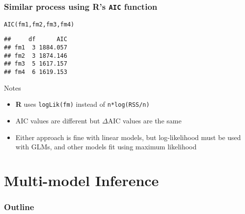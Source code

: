\documentclass[color=usenames,dvipsnames]{beamer}\usepackage[]{graphicx}\usepackage[]{color}
\makeatletter
\newcommand{\hlstd}[1]{\textcolor[rgb]{0,0,0}{#1}}%
\newcommand{\hlkwd}[1]{\textcolor[rgb]{0.004,0.004,0.506}{#1}}%
\newenvironment{kframe}{%
 \def\at@end@of@kframe{}%
 \ifinner\ifhmode%
  \def\at@end@of@kframe{\end{minipage}}%
  \begin{minipage}{\columnwidth}%
 \fi\fi%
 \def\FrameCommand##1{\hskip\@totalleftmargin \hskip-\fboxsep
 \colorbox{shadecolor}{##1}\hskip-\fboxsep
     \hskip-\linewidth \hskip-\@totalleftmargin \hskip\columnwidth}%
 \MakeFramed {\advance\hsize-\width
   \@totalleftmargin\z@ \linewidth\hsize
   \@setminipage}}%
 {\par\unskip\endMakeFramed%
 \at@end@of@kframe}
\newenvironment{knitrout}{}{} %
\makeatother
\begin{document}
\begin{frame}[fragile]
  \frametitle{Similar process using R's {\tt AIC} function}
\begin{knitrout}
\color{fgcolor}\begin{kframe}
\begin{alltt}
\hlkwd{AIC}\hlstd{(fm1, fm2, fm3, fm4)}
\end{alltt}
\begin{verbatim}
##     df      AIC
## fm1  3 1884.057
## fm2  3 1874.146
## fm3  5 1617.157
## fm4  6 1619.153
\end{verbatim}
\end{kframe}
\end{knitrout}
\pause
\vfill
{Notes}
\begin{itemize}[<+->]
  \item {\bf R} uses {\tt logLik(fm)} instead of {\tt n*log(RSS/n)}
  \item AIC values are different but $\Delta$AIC values are the same
  \item Either approach is fine with linear models, but log-likelihood
    must be used with GLMs, and other models fit using maximum likelihood
\end{itemize}
\end{frame}





\section{Multi-model Inference}




\begin{frame}[plain]
  \frametitle{Outline}
  \huge
  \tableofcontents[currentsection]
\end{frame}
\end{document}
